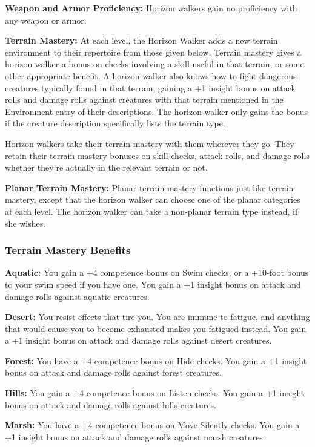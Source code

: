 {
\textbf{Weapon and Armor Proficiency:} Horizon walkers gain no proficiency with any weapon or armor.

\textbf{Terrain Mastery:} At each level, the Horizon Walker adds a new terrain environment to their repertoire from those given below. Terrain mastery gives a horizon walker a bonus on checks involving a skill useful in that terrain, or some other appropriate benefit. A horizon walker also knows how to fight dangerous creatures typically found in that terrain, gaining a +1 insight bonus on attack rolls and damage rolls against creatures with that terrain mentioned in the Environment entry of their descriptions. The horizon walker only gains the bonus if the creature description specifically lists the terrain type.

Horizon walkers take their terrain mastery with them wherever they go. They retain their terrain mastery bonuses on skill checks, attack rolls, and damage rolls whether they're actually in the relevant terrain or not.

\textbf{Planar Terrain Mastery:} Planar terrain mastery functions just like terrain mastery, except that the horizon walker can choose one of the planar categories at each level. The horizon walker can take a non-planar terrain type instead, if she wishes.

\subsubsection{Terrain Mastery Benefits}
\textbf{Aquatic:} You gain a +4 competence bonus on Swim checks, or a +10-foot bonus to your swim speed if you have one. You gain a +1 insight bonus on attack and damage rolls against aquatic creatures.

\textbf{Desert:} You resist effects that tire you. You are immune to fatigue, and anything that would cause you to become exhausted makes you fatigued instead. You gain a +1 insight bonus on attack and damage rolls against desert creatures.

\textbf{Forest:} You have a +4 competence bonus on Hide checks. You gain a +1 insight bonus on attack and damage rolls against forest creatures.

\textbf{Hills:} You gain a +4 competence bonus on Listen checks. You gain a +1 insight bonus on attack and damage rolls against hills creatures.

\textbf{Marsh:} You have a +4 competence bonus on Move Silently checks. You gain a +1 insight bonus on attack and damage rolls against marsh creatures.

}
